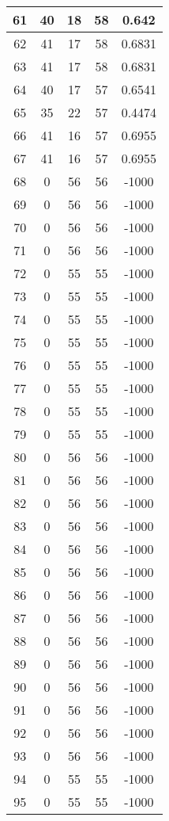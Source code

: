 \documentclass[letterpaper, 12pt]{article}
\begin{document}
\begin{longtable}{|c|c|c|c|c|}
\hline
61 & 40 & 18 & 58 & 0.642 \\
\hline
62 & 41 & 17 & 58 & 0.6831 \\
\hline
63 & 41 & 17 & 58 & 0.6831 \\
\hline
64 & 40 & 17 & 57 & 0.6541 \\
\hline
65 & 35 & 22 & 57 & 0.4474 \\
\hline
66 & 41 & 16 & 57 & 0.6955 \\
\hline
67 & 41 & 16 & 57 & 0.6955 \\
\hline
68 & 0 & 56 & 56 & -1000 \\
\hline
69 & 0 & 56 & 56 & -1000 \\
\hline
70 & 0 & 56 & 56 & -1000 \\
\hline
71 & 0 & 56 & 56 & -1000 \\
\hline
72 & 0 & 55 & 55 & -1000 \\
\hline
73 & 0 & 55 & 55 & -1000 \\
\hline
74 & 0 & 55 & 55 & -1000 \\
\hline
75 & 0 & 55 & 55 & -1000 \\
\hline
76 & 0 & 55 & 55 & -1000 \\
\hline
77 & 0 & 55 & 55 & -1000 \\
\hline
78 & 0 & 55 & 55 & -1000 \\
\hline
79 & 0 & 55 & 55 & -1000 \\
\hline
80 & 0 & 56 & 56 & -1000 \\
\hline
81 & 0 & 56 & 56 & -1000 \\
\hline
82 & 0 & 56 & 56 & -1000 \\
\hline
83 & 0 & 56 & 56 & -1000 \\
\hline
84 & 0 & 56 & 56 & -1000 \\
\hline
85 & 0 & 56 & 56 & -1000 \\
\hline
86 & 0 & 56 & 56 & -1000 \\
\hline
87 & 0 & 56 & 56 & -1000 \\
\hline
88 & 0 & 56 & 56 & -1000 \\
\hline
89 & 0 & 56 & 56 & -1000 \\
\hline
90 & 0 & 56 & 56 & -1000 \\
\hline
91 & 0 & 56 & 56 & -1000 \\
\hline
92 & 0 & 56 & 56 & -1000 \\
\hline
93 & 0 & 56 & 56 & -1000 \\
\hline
94 & 0 & 55 & 55 & -1000 \\
\hline
95 & 0 & 55 & 55 & -1000 \\

\end{longtable}
\end{document}
